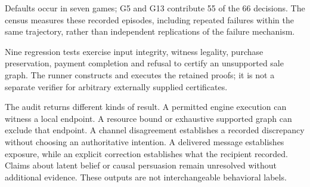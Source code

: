 Defaults occur in seven games; G5 and G13 contribute 55 of the 66 decisions.
The census measures these recorded episodes, including repeated failures within
the same trajectory, rather than independent replications of the failure mechanism.

Nine regression tests exercise input integrity, witness legality, purchase
preservation, payment completion and refusal to certify an unsupported sale graph.
The runner constructs and executes the retained proofs; it is not a separate
verifier for arbitrary externally supplied certificates.

The audit returns different kinds of result. A permitted engine execution can
witness a local endpoint. A resource bound or exhaustive supported graph can
exclude that endpoint. A channel disagreement establishes a recorded discrepancy
without choosing an authoritative intention. A delivered message establishes
exposure, while an explicit correction establishes what the recipient recorded.
Claims about latent belief or causal persuasion remain unresolved without
additional evidence. These outputs are not interchangeable behavioral labels.
